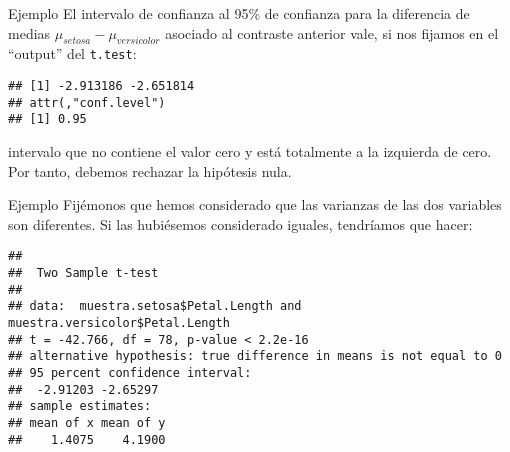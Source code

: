 \documentclass[
  ignorenonframetext,
]{beamer}
\newenvironment{Shaded}{\begin{snugshade}}{\end{snugshade}}
\newcommand{\DataTypeTok}[1]{\textcolor[rgb]{0.13,0.29,0.53}{#1}}
\newcommand{\KeywordTok}[1]{\textcolor[rgb]{0.13,0.29,0.53}{\textbf{#1}}}
\newcommand{\NormalTok}[1]{#1}
\newcommand{\OperatorTok}[1]{\textcolor[rgb]{0.81,0.36,0.00}{\textbf{#1}}}
\newcommand{\OtherTok}[1]{\textcolor[rgb]{0.56,0.35,0.01}{#1}}
\newcommand{\StringTok}[1]{\textcolor[rgb]{0.31,0.60,0.02}{#1}}
\begin{document}
\begin{frame}[fragile]{Ejemplo}
\protect\hypertarget{ejemplo-4}{}
El intervalo de confianza al 95\% de confianza para la diferencia de
medias \(\mu_{{setosa}}-\mu_{{versicolor}}\) asociado al contraste
anterior vale, si nos fijamos en el ``output'' del \texttt{t.test}:

\begin{Shaded}
\end{Shaded}

\begin{verbatim}
## [1] -2.913186 -2.651814
## attr(,"conf.level")
## [1] 0.95
\end{verbatim}

intervalo que no contiene el valor cero y está totalmente a la izquierda
de cero. Por tanto, debemos rechazar la hipótesis nula.
\end{frame}

\begin{frame}[fragile]{Ejemplo}
\protect\hypertarget{ejemplo-5}{}
Fijémonos que hemos considerado que las varianzas de las dos variables
son diferentes. Si las hubiésemos considerado iguales, tendríamos que
hacer:

\begin{Shaded}
\end{Shaded}

\begin{verbatim}
## 
##  Two Sample t-test
## 
## data:  muestra.setosa$Petal.Length and muestra.versicolor$Petal.Length
## t = -42.766, df = 78, p-value < 2.2e-16
## alternative hypothesis: true difference in means is not equal to 0
## 95 percent confidence interval:
##  -2.91203 -2.65297
## sample estimates:
## mean of x mean of y 
##    1.4075    4.1900
\end{verbatim}
\end{frame}
\end{document}
